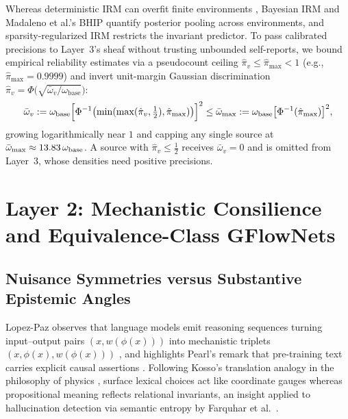 \documentclass[11pt,a4paper]{article}
\theoremstyle{definition}
\theoremstyle{remark}
\begin{document}
Whereas deterministic IRM \cite{arjovsky2019invariant} can overfit finite environments \cite{gulrajani2021search,rosenfeld2021risks,kamath2021does}, Bayesian IRM \cite{lin2022bayesian,xiao2021bit} and Madaleno et al.'s BHIP \cite{madaleno2026bhip} quantify posterior pooling across environments, and sparsity-regularized IRM \cite{zhou2022sparse} restricts the invariant predictor. To pass calibrated precisions to Layer~3's sheaf without trusting unbounded self-reports, we bound empirical reliability estimates via a pseudocount ceiling $\hat{\pi}_v \le \hat{\pi}_{\max} < 1$ (e.g., $\hat{\pi}_{\max} = 0.9999$) and invert unit-margin Gaussian discrimination $\hat{\pi}_v = \Phi\bigl(\sqrt{\bar{\omega}_v / \omega_{\mathrm{base}}}\bigr)$:
\begin{equation}
  \bar{\omega}_v := \omega_{\mathrm{base}} \Bigl[\Phi^{-1}\bigl(\min(\max(\hat{\pi}_v, \tfrac{1}{2}), \hat{\pi}_{\max})\bigr)\Bigr]^2
  \le \bar{\omega}_{\max} := \omega_{\mathrm{base}} \bigl[\Phi^{-1}(\hat{\pi}_{\max})\bigr]^2,
  \label{eq:reliability_map}
\end{equation}
growing logarithmically near $1$ and capping any single source at $\bar{\omega}_{\max} \approx 13.83\,\omega_{\mathrm{base}}$. A source with $\hat{\pi}_v \le \tfrac{1}{2}$ receives $\bar{\omega}_v = 0$ and is omitted from Layer~3, whose densities need positive precisions.

\section{\texorpdfstring{Layer 2: Mechanistic Consilience and Equivalence-Class GFlowNets}{Layer 2: Mechanistic Consilience and Equivalence-Class GFlowNets}}
\label{sec:gflownet}

\subsection{Nuisance Symmetries versus Substantive Epistemic Angles}

Lopez-Paz observes that language models emit reasoning sequences turning input--output pairs $(x, w(\phi(x)))$ into mechanistic triplets $(x, \phi(x), w(\phi(x)))$ \cite{lopezpaz2026against}, and highlights Pearl's remark that pre-training text carries explicit causal assertions \cite{pearl2023interview,lopezpaz2026against}. Following Kosso's translation analogy in the philosophy of physics \cite{kosso2003symmetry}, surface lexical choices act like coordinate gauges whereas propositional meaning reflects relational invariants, an insight applied to hallucination detection via semantic entropy by Farquhar et al.\ \cite{farquhar2024detecting}.
\end{document}

